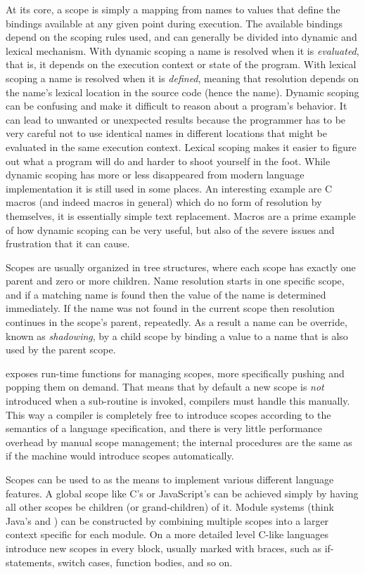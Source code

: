 At its core, a scope is simply a mapping from names to values that define the
bindings available at any given point during execution. The available bindings
depend on the scoping rules used, and can generally be divided into dynamic and
lexical mechanism. With dynamic scoping a name is resolved when it is
\emph{evaluated}, that is, it depends on the execution context or state of the
program. With lexical scoping a name is resolved when it is \emph{defined},
meaning that resolution depends on the name's lexical location in the source
code (hence the name). Dynamic scoping can be confusing and make it difficult to
reason about a program's behavior. It can lead to unwanted or unexpected results
because the programmer has to be very careful not to use identical names in
different locations that might be evaluated in the same execution
context. Lexical scoping makes it easier to figure out what a program will do
and harder to shoot yourself in the foot. While dynamic scoping has more or less
disappeared from modern language implementation\cite{cse341} it is still used in
some places. An interesting example are C macros (and indeed macros in general)
which do no form of resolution by themselves, it is essentially simple text
replacement. Macros are a prime example of how dynamic scoping can be very
useful, but also of the severe issues and frustration that it can cause.

Scopes are usually organized in tree structures, where each scope has exactly
one parent and zero or more children. Name resolution starts in one specific
scope, and if a matching name is found then the value of the name is determined
immediately. If the name was not found in the current scope then resolution
continues in the scope's parent, repeatedly. As a result a name can be override,
known as \textit{shadowing}, by a child scope by binding a value to a name that
is also used by the parent scope.

\thename{} exposes run-time functions for managing scopes, more specifically
pushing and popping them on demand. That means that by default a new scope is
\textit{not} introduced when a sub-routine is invoked, compilers must handle
this manually. This way a compiler is completely free to introduce scopes
according to the semantics of a language specification, and there is very little
performance overhead by manual scope management; the internal procedures are the
same as if the machine would introduce scopes automatically.

Scopes can be used to as the means to implement various different language
features. A global scope like C's or JavaScript's can be achieved simply by
having all other scopes be children (or grand-children) of it. Module systems
(think Java's  and ) can be constructed by combining
multiple scopes into a larger context specific for each module. On a more
detailed level C-like languages introduce new scopes in every block, usually
marked with braces, such as if-statements, switch cases, function bodies, and so
on.


